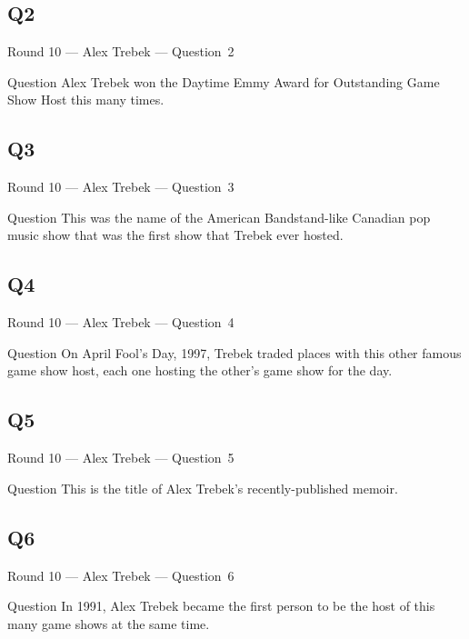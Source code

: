 \documentclass[11pt]{beamer}
\begin{document}
\subsection*{Q2}
\begin{frame}[t]{Round 10 --- Alex Trebek --- \mbox{Question 2}}
\vspace{-0.5em}
\begin{block}{Question}
Alex Trebek won the Daytime Emmy Award for Outstanding Game Show Host this many times.
\end{block}
\end{frame}
\subsection*{Q3}
\begin{frame}[t]{Round 10 --- Alex Trebek --- \mbox{Question 3}}
\vspace{-0.5em}
\begin{block}{Question}
This was the name of the American Bandstand-like Canadian pop music show that was the first show that Trebek ever hosted.
\end{block}
\end{frame}
\subsection*{Q4}
\begin{frame}[t]{Round 10 --- Alex Trebek --- \mbox{Question 4}}
\vspace{-0.5em}
\begin{block}{Question}
On April Fool's Day, 1997, Trebek traded places with this other famous game show host, each one hosting the other's game show for the day.
\end{block}
\end{frame}
\subsection*{Q5}
\begin{frame}[t]{Round 10 --- Alex Trebek --- \mbox{Question 5}}
\vspace{-0.5em}
\begin{block}{Question}
This is the title of Alex Trebek's recently-published memoir.
\end{block}
\end{frame}
\subsection*{Q6}
\begin{frame}[t]{Round 10 --- Alex Trebek --- \mbox{Question 6}}
\vspace{-0.5em}
\begin{block}{Question}
In 1991, Alex Trebek became the first person to be the host of this many game shows at the same time.
\end{block}
\end{frame}
\end{document}
